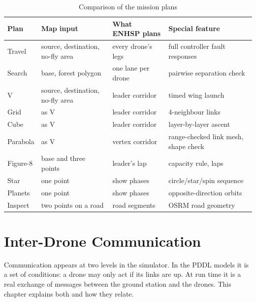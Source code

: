 \documentclass[11pt,a4paper,oneside]{report}
\begin{document}
\begin{table}[!htb]
\caption[Mission comparison]{Comparison of the mission plans}\label{tab:plansummary}
\small
\begin{tabularx}{\textwidth}{@{}lP{0.2\textwidth}P{0.22\textwidth}Y@{}}
\toprule
\textbf{Plan} & \textbf{Map input} & \textbf{What ENHSP plans} & \textbf{Special feature} \\
\midrule
Travel     & source, destination, no-fly area & every drone's legs & full controller fault responses \\
Search     & base, forest polygon & one lane per drone & pairwise separation check \\
V          & source, destination, no-fly area & leader corridor & timed wing launch \\
Grid       & as V & leader corridor & 4-neighbour links \\
Cube       & as V & leader corridor & layer-by-layer ascent \\
Parabola   & as V & vertex corridor & range-checked link mesh, shape check \\
Figure-8   & base and three points & leader's lap & capacity rule, laps \\
Star       & one point & show phases & circle/star/spin sequence \\
Planets    & one point & show phases & opposite-direction orbits \\
Inspect    & two points on a road & road segments & OSRM road geometry \\
\bottomrule
\end{tabularx}
\end{table}

\chapter{Inter-Drone Communication}\label{ch:comm}
Communication appears at two levels in the simulator. In the PDDL models it is a set of
conditions: a drone may only act if its links are up. At run time it is a real exchange of
messages between the ground station and the drones. This chapter explains both and how they
relate.
\end{document}
